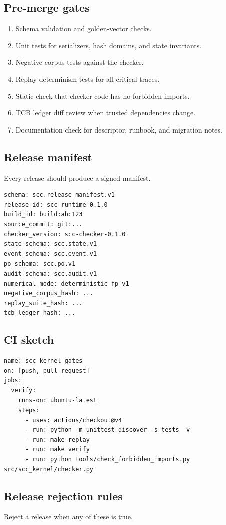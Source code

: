 \documentclass[11pt,oneside]{article}
\begin{document}
\subsection{Pre-merge gates}
\begin{enumerate}
\item Schema validation and golden-vector checks.
\item Unit tests for serializers, hash domains, and state invariants.
\item Negative corpus tests against the checker.
\item Replay determinism tests for all critical traces.
\item Static check that checker code has no forbidden imports.
\item TCB ledger diff review when trusted dependencies change.
\item Documentation check for descriptor, runbook, and migration notes.
\end{enumerate}

\subsection{Release manifest}
Every release should produce a signed manifest.

\begin{lstlisting}[caption={Release manifest shape.}]
schema: scc.release_manifest.v1
release_id: scc-runtime-0.1.0
build_id: build:abc123
source_commit: git:...
checker_version: scc-checker-0.1.0
state_schema: scc.state.v1
event_schema: scc.event.v1
po_schema: scc.po.v1
audit_schema: scc.audit.v1
numerical_mode: deterministic-fp-v1
negative_corpus_hash: ...
replay_suite_hash: ...
tcb_ledger_hash: ...
\end{lstlisting}

\subsection{CI sketch}
\begin{lstlisting}[caption={CI gate sketch.}]
name: scc-kernel-gates
on: [push, pull_request]
jobs:
  verify:
    runs-on: ubuntu-latest
    steps:
      - uses: actions/checkout@v4
      - run: python -m unittest discover -s tests -v
      - run: make replay
      - run: make verify
      - run: python tools/check_forbidden_imports.py src/scc_kernel/checker.py
\end{lstlisting}

\subsection{Release rejection rules}
Reject a release when any of these is true.
\end{document}
